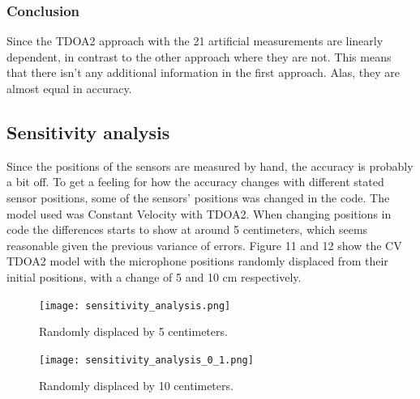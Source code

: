 \documentclass[11pt]{article}
\begin{document}
\subsubsection{Conclusion}
Since the TDOA2 approach with the 21 artificial measurements are linearly dependent, in contrast to the other approach where they are not. This means that there isn't any additional information in the first approach. Alas, they are almost equal in accuracy.


\newpage
\subsection{Sensitivity analysis}
Since the positions of the sensors are measured by hand, the accuracy is probably a bit off. To get a feeling for how the accuracy changes with different stated sensor positions, some of the sensors' positions was changed in the code.
The model used was Constant Velocity with TDOA2. When changing positions in code the differences starts to show at around 5 centimeters, which seems reasonable given the previous variance of errors. Figure 11 and 12 show the CV TDOA2 model with the microphone positions randomly displaced from their initial positions, with a change of 5 and 10 cm respectively.


\begin{figure}
\begin{center}
  \texttt{[image: sensitivity\_analysis.png]}
  \caption{Randomly displaced by 5 centimeters.}
  \end{center}
\end{figure}

\begin{figure}
\begin{center}
  \texttt{[image: sensitivity\_analysis\_0\_1.png]}
  \caption{Randomly displaced by 10 centimeters.}
  \end{center}
\end{figure}
\end{document}
